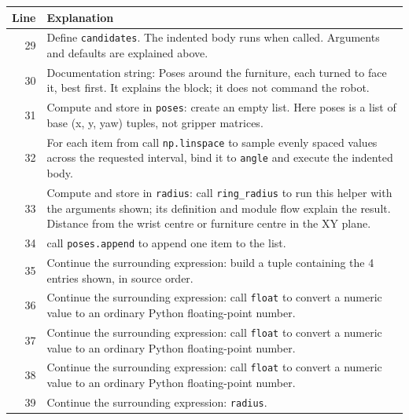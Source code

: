 \documentclass[11pt,a4paper]{book}
\begin{document}
\begin{longtable}{r p{}}

\textbf{Line} & \textbf{Explanation} \\ \hline \endhead

29 & Define \texttt{candidates}. The indented body runs when called. Arguments and defaults are explained above. \\

30 & Documentation string: Poses around the furniture, each turned to face it, best first. It explains the block; it does not command the robot. \\

31 & Compute and store in \texttt{poses}: create an empty list. Here poses is a list of base (x, y, yaw) tuples, not gripper matrices. \\

32 & For each item from call \texttt{np.linspace} to sample evenly spaced values across the requested interval, bind it to \texttt{angle} and execute the indented body. \\

33 & Compute and store in \texttt{radius}: call \texttt{ring\_radius} to run this helper with the arguments shown; its definition and module flow explain the result. Distance from the wrist centre or furniture centre in the XY plane. \\

34 & call \texttt{poses.append} to append one item to the list. \\

35 & Continue the surrounding expression: build a tuple containing the 4 entries shown, in source order. \\

36 & Continue the surrounding expression: call \texttt{float} to convert a numeric value to an ordinary Python floating-point number. \\

37 & Continue the surrounding expression: call \texttt{float} to convert a numeric value to an ordinary Python floating-point number. \\

38 & Continue the surrounding expression: call \texttt{float} to convert a numeric value to an ordinary Python floating-point number. \\

39 & Continue the surrounding expression: \texttt{radius}. \\


\end{longtable}
\end{document}
